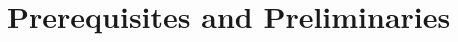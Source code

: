 \documentclass{article}
\theoremstyle{definition}
\begin{document}
    \addtocounter{section}{-1}
    \section{Prerequisites and Preliminaries}
    \addtocounter{subsection}{6}
    
\end{document}
